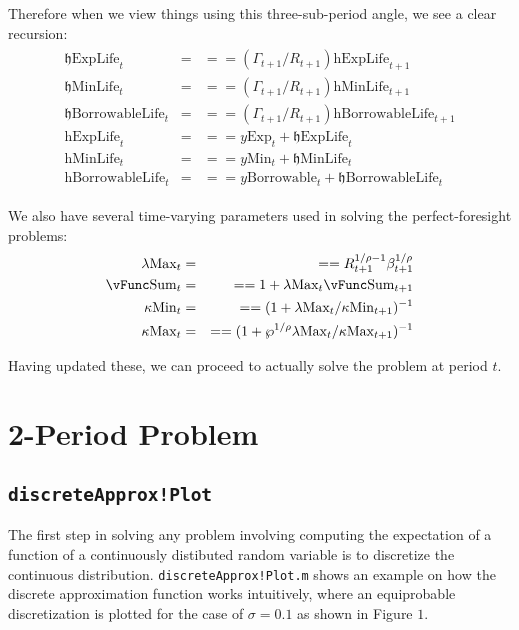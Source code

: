 \documentclass[titlepage,abstract]{\econtex}
\providecommand{\lambdaMax}{\lambda\text{Max}}
\providecommand{\kappaMax}{\kappa\text{Max}}
\providecommand{\kappaMin}{\kappa\text{Min}}
\providecommand{\vSum}{\vFunc\text{Sum}}
\providecommand{\pUnem}{\wp}
\providecommand{\hExpLife}{\mathrm{h}\text{ExpLife}}
\providecommand{\hMinLife}{\mathrm{h}\text{MinLife}}
\providecommand{\hBorrowableLife}{\mathrm{h}\text{BorrowableLife}}
\providecommand{\hEndExpLife}{\mathfrak{h}\text{ExpLife}}
\providecommand{\hEndMinLife}{\mathfrak{h}\text{MinLife}}
\providecommand{\hEndBorrowableLife}{\mathfrak{h}\text{BorrowableLife}}
\providecommand{\yMin}{y\text{Min}}
\providecommand{\yBorrowable}{y\text{Borrowable}}
\providecommand{\yExp}{y\text{Exp}}
\begin{document}
Therefore when we view things using this three-sub-period angle, we see a clear recursion:
\begin{equation}\begin{gathered}\begin{aligned}
          \hEndExpLife_{t}   &=& =  =  (\Gamma_{t+1}/R_{t+1}) \hExpLife_{t+1} \\
          \hEndMinLife_{t}   &=& =  =  (\Gamma_{t+1}/R_{t+1}) \hMinLife_{t+1} \\
          \hEndBorrowableLife_{t}   &=& =  =  (\Gamma_{t+1}/R_{t+1}) \hBorrowableLife_{t+1} \\
          \hExpLife_{t}   &=& =  =  \yExp_{t} +\hEndExpLife_{t} \\
          \hMinLife_{t}   &=& =  =  \yMin_{t} +\hEndMinLife_{t} \\
          \hBorrowableLife_{t}   &=& =  =  \yBorrowable_{t} +\hEndBorrowableLife_{t}
\end{aligned}\end{gathered}\end{equation}

We also have several time-varying parameters used in solving the perfect-foresight problems:
          \begin{equation}\begin{gathered}\begin{aligned}
          \lambdaMax_{t}   &=& =  =  R_{t+1}^{1/\rho-1}\beta_{t+1}^{1/\rho} \\
          \vSum_{t}   &=& =  =  1+ \lambdaMax_{t} \vSum_{t+1} \\
          \kappaMin_{t}   &=& =  =  (1+\lambdaMax_{t}/\kappaMin_{t+1})^{-1} \\
          \kappaMax_{t}   &=& =  =  (1+\pUnem^{1/\rho}\lambdaMax_{t}/\kappaMax_{t+1})^{-1}
          \end{aligned}\end{gathered}\end{equation}

Having updated these, we can proceed to actually solve the problem at period $t$.
          
\section{2-Period Problem}
\subsection{\texttt{discreteApprox!Plot}}
The first step in solving any problem involving computing the expectation of a function of a continuously distibuted random variable is to discretize the continuous distribution. \texttt{discreteApprox!Plot.m} shows an example on how the discrete approximation function works intuitively, where an equiprobable discretization is plotted for the case of $\sigma= 0.1$ as shown in Figure $1$.
\end{document}
